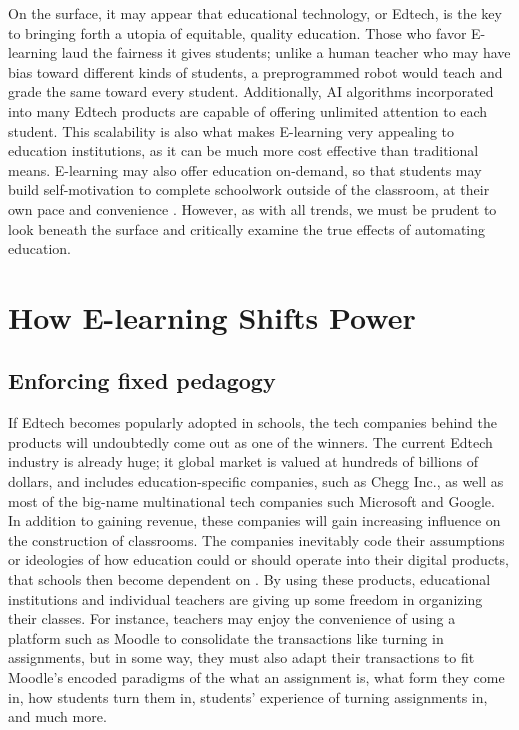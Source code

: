 \documentclass[10pt,twocolumn]{article}
\begin{document}
On the surface, it may appear that educational technology, or Edtech, is the key to bringing forth a utopia of equitable, quality education. Those who favor E-learning laud the fairness it gives students; unlike a human teacher who may have bias toward different kinds of students, a preprogrammed robot would teach and grade the same toward every student. Additionally, AI algorithms incorporated into many Edtech products are capable of offering unlimited attention to each student. This scalability is also what makes E-learning very appealing to education institutions, as it can be much more cost effective than traditional means. E-learning may also offer education on-demand, so that students may build self-motivation to complete schoolwork outside of the classroom, at their own pace and convenience \cite{hamid_2001}. However, as with all trends, we must be prudent to look beneath the surface and critically examine the true effects of automating education.
    
\section{How E-learning Shifts Power}
\subsection{Enforcing fixed pedagogy}
If Edtech becomes popularly adopted in schools, the tech companies behind the products will undoubtedly come out as one of the winners. The current Edtech industry is already huge; it global market is valued at hundreds of billions of dollars, and includes education-specific companies, such as Chegg Inc., as well as most of the big-name multinational tech companies such Microsoft and Google. In addition to gaining revenue, these companies will gain increasing influence on the construction of classrooms. The companies inevitably code their assumptions or ideologies of how education could or should operate into their digital products, that schools then become dependent on \cite{williamson_2017}. By using these products, educational institutions and individual teachers are giving up some freedom in organizing their classes. For instance, teachers may enjoy the convenience of using a platform such as Moodle to consolidate the transactions like turning in assignments, but in some way, they must also adapt their transactions to fit Moodle’s encoded paradigms of the what an assignment is, what form they come in, how students turn them in, students’ experience of turning assignments in, and much more. 
\end{document}
